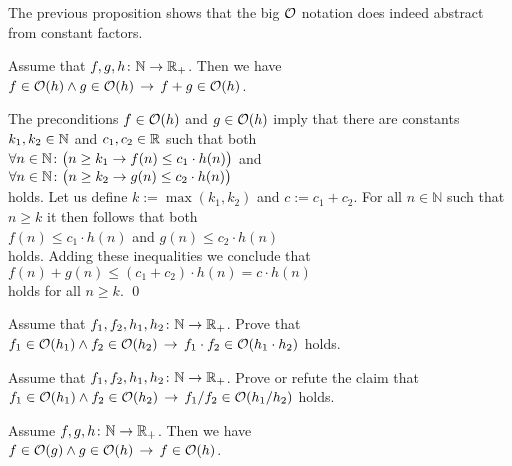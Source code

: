 \remark 
The previous proposition shows that the big $\mathcal{O}$ notation does indeed abstract
from constant factors. \eox

\begin{Proposition}[Addition]
Assume that $f,g,h \colon {\mathbb N} \rightarrow {{\mathbb R}_+}$. Then we have 
\\[0.2cm]
\hspace*{1.3cm}
$f \in \mathcal{O}(h) \wedge g \in \mathcal{O}(h) \,\rightarrow\, f + g \in \mathcal{O}(h)$.
\end{Proposition}

\proof
The preconditions $f \in \mathcal{O}(h)$ and $g \in \mathcal{O}(h)$ imply that there are constants $k_1,k_2\in {\mathbb N}$
and $c_1,c_2\in {\mathbb R}$ such that both \\[0.2cm]
\hspace*{1.3cm} 
$\forall n \in {\mathbb N} \colon \bigl( n \geq k_1 \rightarrow f(n) \leq c_1 \cdot h(n)\bigr)$ 
\quad and
\\[0.2cm]
\hspace*{1.3cm} 
$\forall n \in {\mathbb N} \colon\bigl( n \geq k_2 \rightarrow g(n) \leq c_2 \cdot h(n)\bigr)$
\\[0.2cm]
holds.  Let us define $k := \max(k_1,k_2)$ and $c:= c_1 + c_2$.  For all $n \in \mathbb{N}$ such
that $n \geq k$ it then follows that both
\\[0.2cm]
\hspace*{1.3cm}
 $f(n) \leq c_1 \cdot h(n)$ \quad and \quad  $g(n) \leq c_2 \cdot h(n)$
\\[0.2cm]
holds.  Adding these inequalities we conclude that 
\\[0.2cm]
\hspace*{1.3cm} $f(n) + g(n) \leq (c_1 + c_2) \cdot h(n) = c \cdot h(n)$
\\[0.2cm]
holds for all $n \geq k$.
\qed

\exercise
Assume that $f_1,f_2,h_1,h_2 \colon {\mathbb N} \rightarrow {{\mathbb R}_+}$.  Prove that 
\\[0.2cm]
\hspace*{1.3cm}
$f_1 \in \mathcal{O}(h_1) \wedge f_2 \in \mathcal{O}(h_2) \,\rightarrow\, f_1 \cdot f_2 \in \mathcal{O}(h_1 \cdot h_2)$
\quad holds.  \eox


\exercise
Assume that $f_1,f_2,h_1,h_2 \colon {\mathbb N} \rightarrow {{\mathbb R}_+}$.  Prove or refute the claim that 
\\[0.2cm]
\hspace*{1.3cm}
$f_1 \in \mathcal{O}(h_1) \wedge f_2 \in \mathcal{O}(h_2) \,\rightarrow\, f_1 / f_2 \in \mathcal{O}(h_1 / h_2)$
\quad holds.  \eox

\begin{Proposition}[Transitivity]
Assume $f,g,h \colon {\mathbb N} \rightarrow {{\mathbb R}_+}$. Then we have \\[0.2cm]
\hspace*{1.3cm}
 $f \in \mathcal{O}(g) \wedge g \in \mathcal{O}(h) \,\rightarrow\, f \in \mathcal{O}(h)$.

\end{Proposition}

